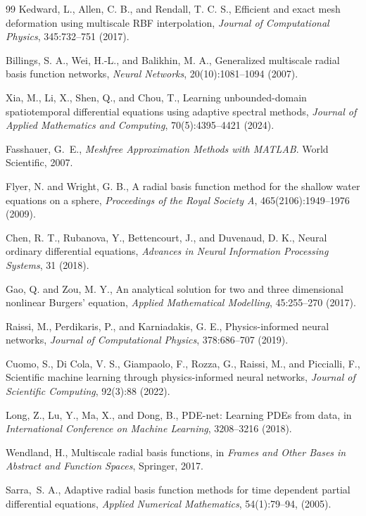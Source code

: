 \begin{thebibliography}{99}
Kedward, L., Allen, C. B., and Rendall, T. C. S.,
Efficient and exact mesh deformation using multiscale RBF interpolation,
\textit{Journal of Computational Physics}, 345:732--751 (2017).

Billings, S. A., Wei, H.-L., and Balikhin, M. A.,
Generalized multiscale radial basis function networks,
\textit{Neural Networks}, 20(10):1081--1094 (2007).

Xia, M., Li, X., Shen, Q., and Chou, T.,
Learning unbounded-domain spatiotemporal differential equations using adaptive spectral methods,
\textit{Journal of Applied Mathematics and Computing}, 70(5):4395--4421 (2024).

Fasshauer, G.~E.,
\textit{Meshfree Approximation Methods with MATLAB}.
World Scientific, 2007.

Flyer, N. and Wright, G. B.,
A radial basis function method for the shallow water equations on a sphere,
\textit{Proceedings of the Royal Society A}, 465(2106):1949--1976 (2009).

Chen, R. T., Rubanova, Y., Bettencourt, J., and Duvenaud, D. K.,
Neural ordinary differential equations,
\textit{Advances in Neural Information Processing Systems}, 31 (2018).

Gao, Q. and Zou, M. Y.,
An analytical solution for two and three dimensional nonlinear Burgers' equation,
\textit{Applied Mathematical Modelling}, 45:255--270 (2017).

Raissi, M., Perdikaris, P., and Karniadakis, G. E.,
Physics-informed neural networks,
\textit{Journal of Computational Physics}, 378:686--707 (2019).

Cuomo, S., Di Cola, V. S., Giampaolo, F., Rozza, G., Raissi, M., and Piccialli, F.,
Scientific machine learning through physics-informed neural networks,
\textit{Journal of Scientific Computing}, 92(3):88 (2022).

Long, Z., Lu, Y., Ma, X., and Dong, B.,
PDE-net: Learning PDEs from data,
in \textit{International Conference on Machine Learning}, 3208--3216 (2018).

Wendland, H.,
Multiscale radial basis functions,
in \textit{Frames and Other Bases in Abstract and Function Spaces}, Springer, 2017.

Sarra,~S. A.,
Adaptive radial basis function methods for time dependent partial differential equations,
\textit{Applied Numerical Mathematics}, 54(1):79--94, (2005).



\end{thebibliography}
